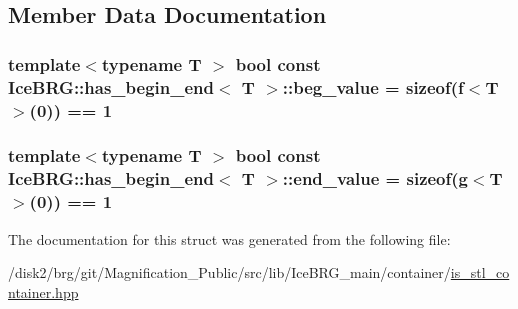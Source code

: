 \subsection{Member Data Documentation}
\hypertarget{structIceBRG_1_1has__begin__end_a7faff69f42f66120c4951827bc42ae31}{}
\subsubsection[{beg\+\_\+value}]{\setlength{\rightskip}{0pt plus 5cm}template$<$typename T $>$ bool const {\bf Ice\+B\+R\+G\+::has\+\_\+begin\+\_\+end}$<$ T $>$\+::beg\+\_\+value = sizeof({\bf f}$<$T$>$(0)) == 1\hspace{0.3cm}{\ttfamily [static]}}\label{structIceBRG_1_1has__begin__end_a7faff69f42f66120c4951827bc42ae31}
\hypertarget{structIceBRG_1_1has__begin__end_a97583e8fb3ea442fd92e26047d8381fc}{}
\subsubsection[{end\+\_\+value}]{\setlength{\rightskip}{0pt plus 5cm}template$<$typename T $>$ bool const {\bf Ice\+B\+R\+G\+::has\+\_\+begin\+\_\+end}$<$ T $>$\+::end\+\_\+value = sizeof({\bf g}$<$T$>$(0)) == 1\hspace{0.3cm}{\ttfamily [static]}}\label{structIceBRG_1_1has__begin__end_a97583e8fb3ea442fd92e26047d8381fc}


The documentation for this struct was generated from the following file\+:\begin{DoxyCompactItemize}
\item 
/disk2/brg/git/\+Magnification\+\_\+\+Public/src/lib/\+Ice\+B\+R\+G\+\_\+main/container/\hyperlink{is__stl__container_8hpp}{is\+\_\+stl\+\_\+container.\+hpp}\end{DoxyCompactItemize}
